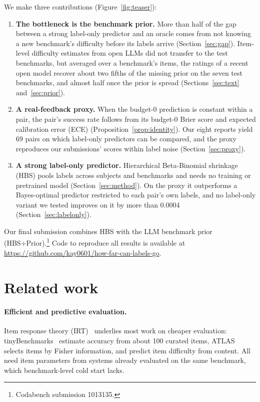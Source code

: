 \documentclass{article}
\newcommand{\finalid}{1013135}
\begin{document}
We make three contributions (Figure~\ref{fig:teaser}):
\begin{enumerate}
  \item \textbf{The bottleneck is the benchmark prior.} More than half of the gap between a strong label-only predictor and an oracle comes from not knowing a new benchmark's difficulty before its labels arrive (Section~\ref{sec:gap}). Item-level difficulty estimates from open LLMs did not transfer to the test benchmarks, but averaged over a benchmark's items, the ratings of a recent open model recover about two fifths of the missing prior on the seven test benchmarks, and almost half once the prior is spread (Sections~\ref{sec:text} and~\ref{sec:prior}).
  \item \textbf{A real-feedback proxy.} When the budget-0 prediction is constant within a pair, the pair's success rate follows from its budget-0 Brier score and expected calibration error (ECE) (Proposition~\ref{prop:identity}). Our eight reports yield 69 pairs on which label-only predictors can be compared, and the proxy reproduces our submissions' scores within label noise (Section~\ref{sec:proxy}).
  \item \textbf{A strong label-only predictor.} Hierarchical Beta-Binomial shrinkage (HBS) pools labels across subjects and benchmarks and needs no training or pretrained model (Section~\ref{sec:method}). On the proxy it outperforms a Bayes-optimal predictor restricted to each pair's own labels, and no label-only variant we tested improves on it by more than 0.0004 (Section~\ref{sec:labelonly}).
\end{enumerate}
Our final submission combines HBS with the LLM benchmark prior (HBS+Prior).\footnote{Codabench submission \finalid.} Code to reproduce all results is available at \url{https://github.com/kay0601/how-far-can-labels-go}.

\section{Related work}
\label{sec:related}

\paragraph{Efficient and predictive evaluation.} Item response theory (IRT)~\citep{lord1980applications} underlies most work on cheaper evaluation: tinyBenchmarks~\citep{maiapolo2024tinybenchmarks} estimate accuracy from about 100 curated items, ATLAS~\citep{li2025atlas} selects items by Fisher information, and \citet{truong2025reliable} predict item difficulty from content. All need item parameters from systems already evaluated on the same benchmark, which benchmark-level cold start lacks.
\end{document}
